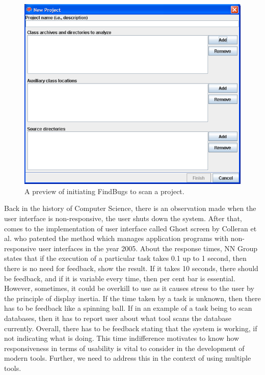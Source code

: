 \begin{figure}[hbt!]
	\centering
	\includegraphics[width=\linewidth]{figures/findbugs-scan}
	\caption{A preview of initiating FindBugs to scan a project. \cite{findbugs}}
	\label{fig:findbugs-scan}
\end{figure}

Back in the history of Computer Science, there is an observation made when the user interface is non-responsive, the user shuts down the system. After that, comes to the implementation of user interface called Ghost screen by Colleran et al. \cite{colleran} who patented the method which manages application programs with non-responsive user interfaces in the year 2005. About the response times, NN Group \cite{nn} states that if the execution of a particular task takes 0.1 up to 1 second, then there is no need for feedback, show the result. If it takes 10 seconds, there should be feedback, and if it is variable every time, then per cent bar \cite{Borman} is essential. However, sometimes, it could be overkill to use as it causes stress to the user by the principle of display inertia. If the time taken by a task is unknown, then there has to be feedback like a spinning ball. If in an example of a task being to scan databases, then it has to report user about what tool scans the database currently. Overall, there has to be feedback stating that the system is working, if not indicating what is doing. This time indifference motivates to know how responsiveness in terms of usability is vital to consider in the development of modern tools. Further, we need to address this in the context of using multiple tools. \\ \\


